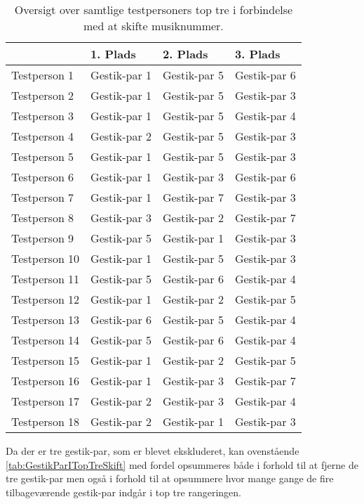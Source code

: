 \begin{table}[H]
	\centering
	\begin{tabular}{ | p{3cm} | p{3cm} | p{3cm} | p{3cm} |}
		\hline
		& 1. Plads & 2. Plads & 3. Plads \\ \hline
		Testperson 1 & Gestik-par 1 & Gestik-par 5 & Gestik-par 6 \\ \hline
		Testperson 2 & Gestik-par 1 & Gestik-par 5 & Gestik-par 3 \\ \hline
		Testperson 3 & Gestik-par 1 & Gestik-par 5 & Gestik-par 4 \\ \hline
		Testperson 4 & Gestik-par 2 & Gestik-par 5 & Gestik-par 3 \\ \hline
		Testperson 5 & Gestik-par 1 & Gestik-par 5 & Gestik-par 3 \\ \hline
		Testperson 6 & Gestik-par 1 & Gestik-par 3 & Gestik-par 6 \\ \hline 
		Testperson 7 & Gestik-par 1 & Gestik-par 7 & Gestik-par 3 \\ \hline
		Testperson 8 & Gestik-par 3 & Gestik-par 2 & Gestik-par 7 \\ \hline
		Testperson 9 & Gestik-par 5 & Gestik-par 1 & Gestik-par 3 \\ \hline
		Testperson 10 & Gestik-par 1 & Gestik-par 5 & Gestik-par 3 \\ \hline
		Testperson 11 & Gestik-par 5 & Gestik-par 6 & Gestik-par 4 \\ \hline
		Testperson 12 & Gestik-par 1 & Gestik-par 2 & Gestik-par 5 \\ \hline
		Testperson 13 & Gestik-par 6 & Gestik-par 5 & Gestik-par 4 \\ \hline
		Testperson 14 & Gestik-par 5 & Gestik-par 6 & Gestik-par 4 \\ \hline
		Testperson 15 & Gestik-par 1 & Gestik-par 2 & Gestik-par 5 \\ \hline
		Testperson 16 & Gestik-par 1 & Gestik-par 3 & Gestik-par 7 \\ \hline
		Testperson 17 & Gestik-par 2 & Gestik-par 3 & Gestik-par 4 \\ \hline
		Testperson 18 & Gestik-par 2 & Gestik-par 1 & Gestik-par 3 \\ \hline
	\end{tabular}
	\caption{Oversigt over samtlige testpersoners top tre i forbindelse med at skifte musiknummer.}
	\label{tab:GestikParITopTreSkift}
\end{table}
\noindent
%
Da der er tre gestik-par, som er blevet ekskluderet, kan ovenstående  \autoref{tab:GestikParITopTreSkift} med fordel opsummeres både i forhold til at fjerne de tre gestik-par men også i forhold til at opsummere hvor mange gange de fire tilbageværende gestik-par indgår i top tre rangeringen. 
